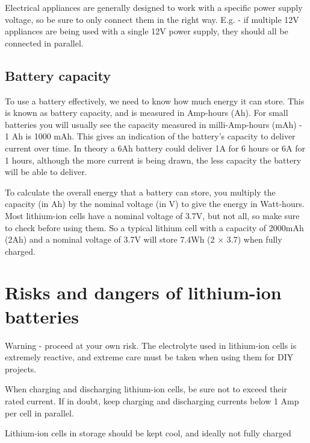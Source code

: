 \documentclass{article}
\theoremstyle{definition}
\theoremstyle{definition}
\theoremstyle{remark}
\begin{document}
    Electrical appliances are generally designed to work with a specific power supply voltage, so be sure to only connect them in the right way. E.g. - if multiple 12V appliances are being used with a single 12V power supply, they should all be connected in parallel.
  

  \subsection{Battery capacity} %
  \label{sub:battery_capacity}

    To use a battery effectively, we need to know how much energy it can store. This is known as battery capacity, and is measured in Amp-hours (Ah). For small batteries you will usually see the capacity measured in milli-Amp-hours (mAh) - 1 Ah is 1000 mAh. This gives an indication of the battery’s capacity to deliver current over time. In theory a 6Ah battery could deliver 1A for 6 hours or 6A for 1 hours, although the more current is being drawn, the less capacity the battery will be able to deliver. 
  
    To calculate the overall energy that a battery can store, you multiply the capacity (in Ah) by the nominal voltage (in V) to give the energy in Watt-hours. Most lithium-ion cells have a nominal voltage of 3.7V, but not all, so make sure to check before using them. So a typical lithium cell with a capacity of 2000mAh (2Ah) and a nominal voltage of 3.7V will store 7.4Wh (2 \(\times\) 3.7) when fully charged.
  


\section{Risks and dangers of lithium-ion batteries} %
\label{sec:risks_and_dangers_of_lithium_ion_batteries}

  Warning - proceed at your own risk. The electrolyte used in lithium-ion cells is extremely reactive, and extreme care must be taken when using them for DIY projects.

  When charging and discharging lithium-ion cells, be sure not to exceed their rated current. If in doubt, keep charging and discharging currents below 1 Amp per cell in parallel.

  Lithium-ion cells in storage should be kept cool, and ideally not fully charged
\end{document}
